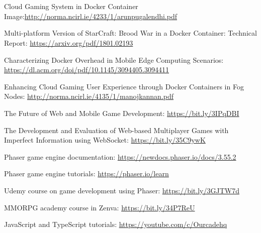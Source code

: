 \documentclass[oneside,12pt]{Classes/VTU}
\begin{document}
\section*{}
	\pagebreak
	\begin{thebibliography}{99}
		\thispagestyle{fancy}
		 Cloud Gaming System in Docker Container Image:\newline \url{http://norma.ncirl.ie/4233/1/arunpugalendhi.pdf}
		
		 Multi-platform Version of StarCraft: Brood War in a Docker Container: Technical Report: \newline \url{https://arxiv.org/pdf/1801.02193}
		
		 Characterizing Docker Overhead in Mobile Edge Computing Scenarios: \newline \url{https://dl.acm.org/doi/pdf/10.1145/3094405.3094411}
		
		 Enhancing Cloud Gaming User Experience through Docker Containers in Fog Nodes: \newline \url{http://norma.ncirl.ie/4135/1/manojkannan.pdf}
		
		 The Future of Web and Mobile Game Development: \newline \url{https://bit.ly/3IPqDBI}
		
		 The Development and Evaluation of Web-based Multiplayer Games with Imperfect Information using WebSocket: \newline \url{https://bit.ly/35C9ywK}
		
		 Phaser game engine documentation: \newline \url{https://newdocs.phaser.io/docs/3.55.2}
		
		 Phaser game engine tutorials: \newline  \url{https://phaser.io/learn}
		
		 Udemy course on game development using Phaser: \newline \url{https://bit.ly/3GJTW7d}
		
		 MMORPG academy course in Zenva: \newline \url{https://bit.ly/34P7ReU}
		
		 JavaScript and TypeScript tutorials: \newline \url{https://youtube.com/c/Ourcadehq}
	\end{thebibliography}
	 
\end{document}
